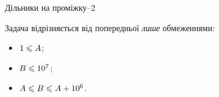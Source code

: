 \begin{problemAllDefault}{Дільники на проміжку--2}\label{task:divisors-in-range-2}

Задача відрізняється від попередньої \emph{лише} обмеженнями:

\vspace{-1\baselineskip}

\begin{multicols}{3}
\begin{itemize}
\item
$1\leqslant A$;
\item
$B\leqslant10^7$;
\item
$A\leqslant B\leqslant A+10^6$.
\end{itemize}
\end{multicols}

\vspace{-0.5\baselineskip}

\end{problemAllDefault}